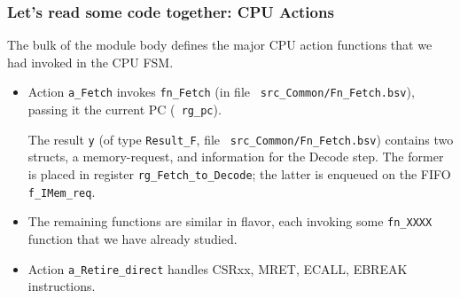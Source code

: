 \begin{frame}[fragile]
\frametitle{Let's read some code together: {\DRUM} CPU Actions}

\begin{center}\scriptsize


 \vspace*{5ex}

 The bulk of the module body defines the major CPU action functions
 that we had invoked in the CPU FSM.

 \vspace*{2ex}

 \begin{minipage}{0.8\textwidth}
  \begin{itemize}

   \item Action {\tt a\_Fetch} invokes {\tt fn\_Fetch} (in file {\tt
     src\_Common/Fn\_Fetch.bsv}), passing it the current PC ({\tt
     rg\_pc}).

     \vspace*{1ex}

     The result {\tt y} (of type {\tt Result\_F}, file {\tt
     src\_Common/Fn\_Fetch.bsv}) contains two structs, a
     memory-request, and information for the Decode step.  The former
     is placed in register {\tt rg\_Fetch\_to\_Decode}; the latter is
     enqueued on the FIFO {\tt f\_IMem\_req}.

   \vspace*{1ex}

   \item The remaining functions are similar in flavor, each invoking
     some {\tt fn\_XXXX} function that we have already studied.

   \vspace*{1ex}

   \item Action {\tt a\_Retire\_direct} handles CSRxx, MRET, ECALL,
     EBREAK instructions.

   \vspace*{1ex}


\end{itemize}
\end{minipage}
\end{center}
\end{frame}
